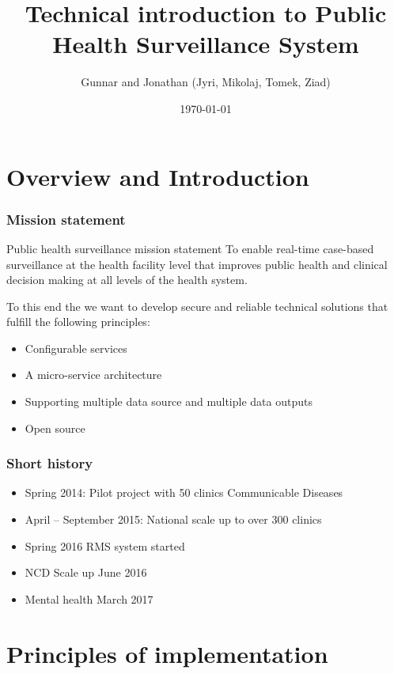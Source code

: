 \documentclass{beamer}
\title[Public Health Surveillance]{Technical introduction to Public Health Surveillance System}
\author{Gunnar and Jonathan (Jyri, Mikolaj, Tomek, Ziad)}
\institute[WHO]{World Health Organisation}
\date{\today}
\begin{document}
\begin{frame}
\titlepage
\end{frame}

\begin{frame}
\tableofcontents
\end{frame}

\section{Overview and Introduction}

\begin{frame}
  \frametitle{Mission statement}

  \begin{block}{Public health surveillance mission statement}
    To enable real-time case-based surveillance at the health facility level that improves public health and clinical decision making at all levels of the health system.
  \end{block}
  \vspace{10pt}
  To this end the we want to develop secure and reliable technical solutions that fulfill the following principles:

  
  \begin{itemize}
  \item Configurable services
  \item A micro-service architecture
  \item Supporting multiple data source and multiple data outputs
  \item Open source
  \end{itemize}
\end{frame}  

\begin{frame}
  \frametitle{Short history}
  \begin{itemize}
  \item Spring 2014: Pilot project with 50 clinics Communicable Diseases
  \item April -- September 2015: National scale up to over 300 clinics
  \item Spring 2016 RMS system started
  \item NCD Scale up June 2016
  \item Mental health March 2017
  \end{itemize}
\end{frame}

\section{Principles of implementation}
\end{document}

